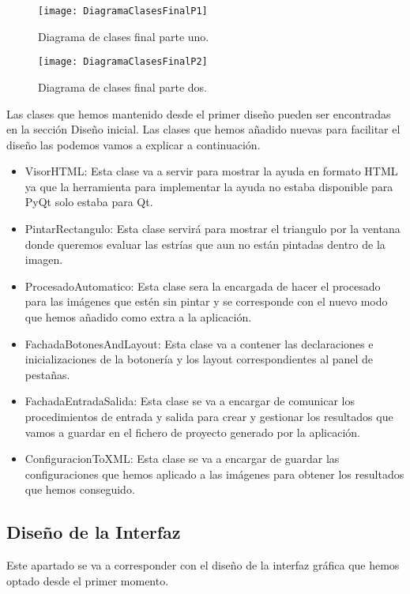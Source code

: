 \begin{figure}[h]
	\centering
	\texttt{[image: DiagramaClasesFinalP1]}
	\caption{Diagrama de clases final parte uno.}
	\label{fig:finalP1}
\end{figure}

\begin{figure}[h]
	\centering
	\texttt{[image: DiagramaClasesFinalP2]}
	\caption{Diagrama de clases final parte dos.}
	\label{fig:finalP2}
\end{figure}

Las clases que hemos mantenido desde el primer diseño pueden ser encontradas en la sección Diseño inicial.
Las clases que hemos añadido nuevas para facilitar el diseño las podemos vamos a explicar a continuación.

\begin{itemize}
	\item VisorHTML: Esta clase va a servir para mostrar la ayuda en formato HTML ya que la herramienta para implementar la ayuda no estaba disponible para PyQt solo estaba para Qt.
	\item PintarRectangulo: Esta clase servirá para mostrar el triangulo por la ventana donde queremos evaluar las estrías que aun no están pintadas dentro de la imagen.
	\item ProcesadoAutomatico: Esta clase sera la encargada de hacer el procesado para las imágenes que estén sin pintar y se corresponde con el nuevo modo que hemos añadido como extra a la aplicación.
	\item FachadaBotonesAndLayout: Esta clase va a contener las declaraciones e inicializaciones de la botonería y los layout correspondientes al panel de pestañas.
	\item FachadaEntradaSalida: Esta clase se va a encargar de comunicar los procedimientos de entrada y salida para crear y gestionar los resultados que vamos a guardar en el fichero de proyecto generado por la aplicación.
	\item ConfiguracionToXML: Esta clase se va a encargar de guardar las configuraciones que hemos aplicado a las imágenes para obtener los resultados que hemos conseguido.
\end{itemize}

\subsection{Diseño de la Interfaz}
Este apartado se va a corresponder con el diseño de la interfaz gráfica que hemos optado desde el primer momento.

